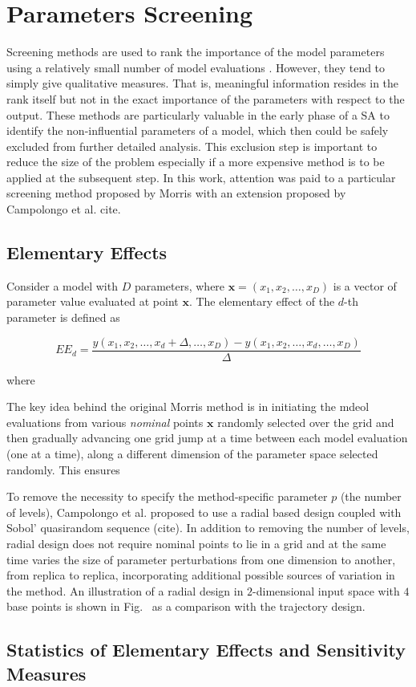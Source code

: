 \section{Parameters Screening}\label{sec:sa_parameters_screening}

Screening methods are used to rank the importance of the model parameters using a relatively small number of model evaluations \cite{Saltelli2004}.
However, they tend to simply give qualitative measures.
That is, meaningful information resides in the rank itself but not in the exact importance of the parameters with respect to the output. 
These methods are particularly valuable in the early phase of a SA to identify the non-influential parameters of a model, 
which then could be safely excluded from further detailed analysis. 
This exclusion step is important to reduce the size of the problem especially if a more expensive method is to be applied at the subsequent step. 
In this work, attention was paid to a particular screening method proposed by Morris \cite{Morris1991} with an extension proposed by Campolongo et al. cite.

\subsection{Elementary Effects}

Consider a model with $D$ parameters, where $\mathbf{x} = (x_1, x_2, \dots,x_D)$ is a vector of parameter value evaluated at point $\mathbf{x}$.
The elementary effect of the $d$-th parameter is defined as

\begin{equation}
EE_d = \frac{y(x_1, x_2, \dots, x_d+\Delta,\dots,x_D) - y(x_1, x_2, \dots, x_d,\dots,x_D)}{\Delta}
\end{equation}

where

The key idea behind the original Morris method is in initiating the mdeol evaluations from various \textit{nominal} points $\mathbf{x}$ randomly selected over the grid and then gradually advancing one grid jump at a time between each model evaluation (one at a time), along a different dimension of the parameter space selected randomly. This ensures 

To remove the necessity to specify the method-specific parameter $p$ (the number of levels), Campolongo et al. proposed to use a radial based design coupled with Sobol' quasirandom sequence (cite). In addition to removing the number of levels, radial design does not require nominal points to lie in a grid and at the same time varies the size of parameter perturbations from one dimension to another, from replica to replica, incorporating additional possible sources of variation in the method.
An illustration of a radial design in $2$-dimensional input space with $4$ base points is shown in Fig.~ as a comparison with the trajectory design.

 
\subsection{Statistics of Elementary Effects and Sensitivity Measures}

